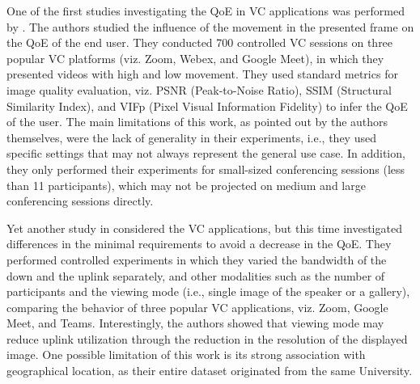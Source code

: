 One of the first studies investigating the QoE in VC applications was performed by \cite{chang2021can}. The authors studied the influence of the movement in the presented frame on the QoE of the end user. They conducted 700 controlled VC sessions on three popular VC platforms (viz. Zoom, Webex, and Google Meet), in which they presented videos with high and low movement. They used standard metrics for image quality evaluation, viz. PSNR (Peak-to-Noise Ratio), SSIM (Structural Similarity Index), and VIFp (Pixel Visual Information Fidelity) to infer the QoE of the user. 
The main limitations of this work, as pointed out by the authors themselves, were the lack of generality in their experiments, i.e., they used specific settings that may not always represent the general use case. In addition, they only performed their experiments for small-sized conferencing sessions (less than 11 participants), which may not be projected on medium and large conferencing sessions directly.


Yet another study in \cite{macmillan2021measuring} considered the VC applications, but this time investigated differences in the minimal requirements to avoid a decrease in the QoE. They performed controlled experiments in which they varied the bandwidth of the down and the uplink separately, and other modalities such as the number of participants and the viewing mode (i.e., single image of the speaker or a gallery), comparing the behavior of three popular VC applications, viz. Zoom, Google Meet, and Teams. Interestingly, the authors showed that viewing mode may reduce uplink utilization through the reduction in the resolution of the displayed image. One possible limitation of this work is its strong association with geographical location, as their entire dataset originated from the same University.


